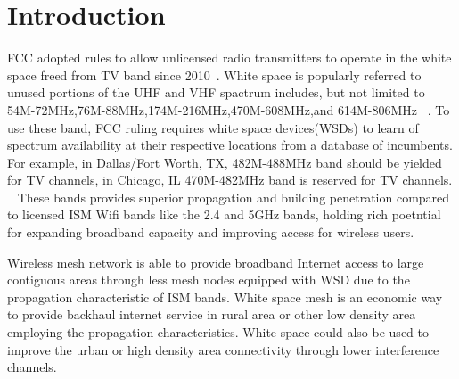 
\section{Introduction}
\label{sec:introduction}

FCC adopted rules to allow unlicensed radio transmitters to operate in the white space freed from TV band since 2010~\cite{fccwhitespace}. White space is popularly referred to unused portions of the UHF and VHF spactrum includes, but not limited to 54M-72MHz,76M-88MHz,174M-216MHz,470M-608MHz,and 614M-806MHz ~\cite{whitespacewiki}.
To use these band, FCC ruling requires white space devices(WSDs) to learn of spectrum availability at their respective locations from a database of incumbents. For example, in Dallas/Fort Worth, TX, 482M-488MHz band should be yielded for TV channels, in Chicago, IL 470M-482MHz band is reserved for TV channels. ~\cite{broadband}
 These bands provides superior propagation and building penetration compared to licensed ISM Wifi bands like the 2.4 and 5GHz bands, holding rich poetntial for expanding broadband capacity and improving access for wireless users.

Wireless mesh network is able to provide broadband Internet access to large contiguous areas through less mesh nodes equipped with WSD due to the propagation characteristic of ISM bands. White space mesh is an economic way to provide backhaul internet service in rural area or other low density area employing the propagation characteristics.
White space could also be used to improve the urban or high density area connectivity through lower interference channels. 

